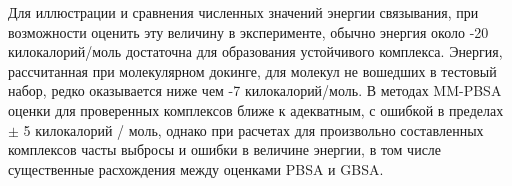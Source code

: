 Для иллюстрации и сравнения численных значений энергии связывания, при возможности оценить эту величину в эксперименте, обычно энергия около -20 килокалорий/моль достаточна для образования устойчивого комплекса. Энергия, рассчитанная при молекулярном докинге, для молекул не вошедших в тестовый набор, редко оказывается ниже чем -7 килокалорий/моль. В методах MM-PBSA оценки для проверенных комплексов ближе к адекватным, с ошибкой в пределах $\pm$ 5 килокалорий / моль, однако при расчетах для произвольно составленных комплексов часты выбросы и ошибки в величине энергии, в том числе существенные расхождения между оценками PBSA и GBSA.



  






